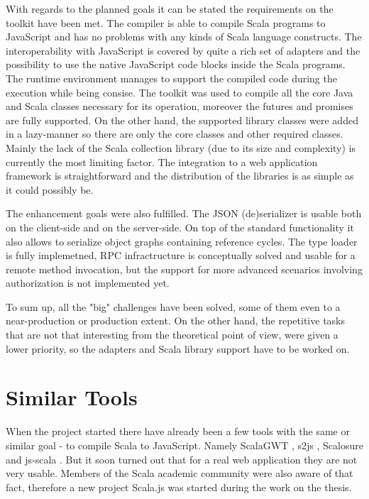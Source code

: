 \documentclass[12pt,a4paper]{report}
\begin{document}
With regards to the planned goals it can be stated the requirements on the toolkit have been met. The compiler is able to compile Scala programs to JavaScript and has no problems with any kinds of Scala language constructs. The interoperability with JavaScript is covered by quite a rich set of adapters and the possibility to use the native JavaScript code blocks inside the Scala programs. The runtime environment manages to support the compiled code during the execution while being consise. The toolkit was used to compile all the core Java and Scala classes necessary for its operation, moreover the futures and promises are fully supported. On the other hand, the supported library classes were added in a lazy-manner so there are only the core classes and other required classes. Mainly the lack of the Scala collection library (due to its size and complexity) is currently the most limiting factor. The integration to a web application framework is straightforward and the distribution of the libraries is as simple as it could possibly be.

The enhancement goals were also fulfilled. The JSON (de)serializer is usable both on the client-side and on the server-side. On top of the standard functionality it also allows to serialize object graphs containing reference cycles. The type loader is fully implemetned, RPC infractructure is conceptually solved and usable for a remote method invocation, but the support for more advanced scenarios involving authorization is not implemented yet.

To sum up, all the "big" challenges have been solved, some of them even to a near-production or production extent. On the other hand, the repetitive tasks that are not that interesting from the theoretical point of view, were given a lower priority, so the adapters and Scala library support have to be worked on.

\section{Similar Tools}

When the project started there have already been a few tools with the same or similar goal - to compile Scala to JavaScript. Namely ScalaGWT \cite{ScalaGwt}, s2js \cite{S2js}, Scalosure \cite{Scalosure} and js-scala  \cite{JsScala}. But it soon turned out that for a real web application they are not very usable. Members of the Scala academic community were also aware of that fact, therefore a new project Scala.js \cite{ScalaJs} was started during the work on the thesis.
\end{document}
